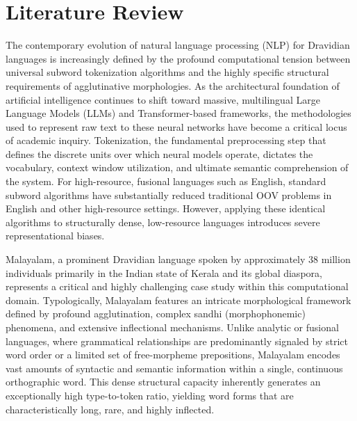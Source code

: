 \documentclass[12pt]{article}
\begin{document}
	\newpage
	
	\section*{Literature Review}
	The contemporary evolution of natural language processing (NLP) for Dravidian languages is increasingly defined by the profound computational tension between universal subword tokenization algorithms and the highly specific structural requirements of agglutinative morphologies. As the architectural foundation of artificial intelligence continues to shift toward massive, multilingual Large Language Models (LLMs) and Transformer-based frameworks, the methodologies used to represent raw text to these neural networks have become a critical locus of academic inquiry. Tokenization, the fundamental preprocessing step that defines the discrete units over which neural models operate, dictates the vocabulary, context window utilization, and ultimate semantic comprehension of the system. For high-resource, fusional languages such as English, standard subword algorithms have substantially reduced traditional OOV problems in English and other high-resource settings.\cite{sennrich-etal-2016-neural} However, applying these identical algorithms to structurally dense, low-resource languages introduces severe representational biases.
	
	Malayalam, a prominent Dravidian language spoken by approximately 38 million individuals primarily in the Indian state of Kerala and its global diaspora, represents a critical and highly challenging case study within this computational domain. Typologically, Malayalam features an intricate morphological framework defined by profound agglutination, complex sandhi (morphophonemic) phenomena, and extensive inflectional mechanisms. Unlike analytic or fusional languages, where grammatical relationships are predominantly signaled by strict word order or a limited set of free-morpheme prepositions, Malayalam encodes vast amounts of syntactic and semantic information within a single, continuous orthographic word. This dense structural capacity inherently generates an exceptionally high type-to-token ratio, yielding word forms that are characteristically long, rare, and highly inflected.\cite{thottingal2019mlmorph}\cite{devadath2014sandhi}
	
\end{document}
